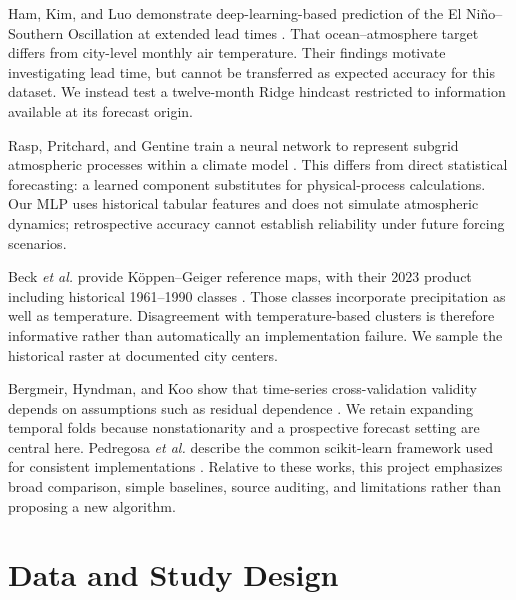 \documentclass[conference]{IEEEtran}
\begin{document}
Ham, Kim, and Luo demonstrate deep-learning-based prediction of the El Ni\~no--Southern Oscillation at extended lead times \cite{ham}. That ocean--atmosphere target differs from city-level monthly air temperature. Their findings motivate investigating lead time, but cannot be transferred as expected accuracy for this dataset. We instead test a twelve-month Ridge hindcast restricted to information available at its forecast origin.

Rasp, Pritchard, and Gentine train a neural network to represent subgrid atmospheric processes within a climate model \cite{rasp}. This differs from direct statistical forecasting: a learned component substitutes for physical-process calculations. Our MLP uses historical tabular features and does not simulate atmospheric dynamics; retrospective accuracy cannot establish reliability under future forcing scenarios.

Beck \emph{et al.} provide K\"oppen--Geiger reference maps, with their 2023 product including historical 1961--1990 classes \cite{beck2018,beck2023}. Those classes incorporate precipitation as well as temperature. Disagreement with temperature-based clusters is therefore informative rather than automatically an implementation failure. We sample the historical raster at documented city centers.

Bergmeir, Hyndman, and Koo show that time-series cross-validation validity depends on assumptions such as residual dependence \cite{bergmeir}. We retain expanding temporal folds because nonstationarity and a prospective forecast setting are central here. Pedregosa \emph{et al.} describe the common scikit-learn framework used for consistent implementations \cite{pedregosa}. Relative to these works, this project emphasizes broad comparison, simple baselines, source auditing, and limitations rather than proposing a new algorithm.

\section{Data and Study Design}
\end{document}
